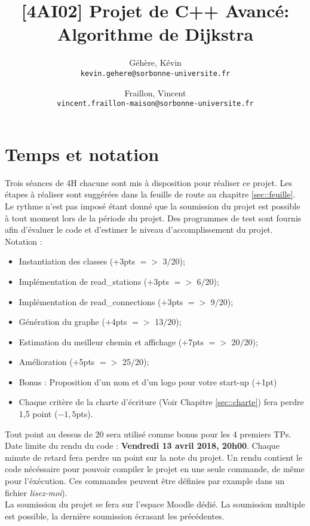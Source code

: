 \documentclass[9pts]{article}
\title{[4AI02] Projet de C++ Avancé: Algorithme de Dijkstra}
\author{
  Géhère, Kévin\\
  \texttt{kevin.gehere@sorbonne-universite.fr}
  \and
  Fraillon, Vincent\\
  \texttt{vincent.fraillon-maison@sorbonne-universite.fr}
}
\begin{document}
\maketitle

\section{Temps et notation}

Trois séances de 4H chacune sont mis à disposition pour réaliser ce projet.
Les étapes à réaliser sont suggérées dans la feuille de route au chapitre \ref{sec::feuille}. Le rythme n'est pas imposé étant donné que la soumission du projet est possible à tout moment lors de la période du projet.
Des programmes de test sont fournis afin d'évaluer le code et d'estimer le niveau d'accomplissement du projet.\\

Notation :
\begin{itemize}
\item Instantiation des classes ($+$3pts $=>$ 3$/$20);
\item Implémentation de read\_stations ($+$3pts $=>$ 6$/$20);
\item Implémentation de read\_connections ($+$3pts $=>$ 9$/$20);
\item Génération du graphe ($+$4pts $=>$ 13$/$20);
\item Estimation du meilleur chemin et affichage ($+$7pts $=>$ 20$/$20);
\item Amélioration ($+$5pts $=>$ 25$/$20);
\item Bonus : Proposition d'un nom et d'un logo pour votre start-up ($+$1pt)
\item Chaque critère de la charte d'écriture (Voir Chapitre \ref{sec::charte}) fera perdre 1,5 point ($-1,5$pts).\\
\end{itemize}

Tout point au dessus de 20 sera utilisé comme bonus pour les 4 premiers TPs.\\

Date limite du rendu du code : \textbf{Vendredi 13 avril 2018, 20h00}. Chaque minute de retard fera perdre un point sur la note du projet. Un rendu contient le code nécéssaire pour pouvoir compiler le projet en une seule commande, de même pour l'éxécution. Ces commandes peuvent être définies par example dans un fichier \emph{lisez-moi}). \\

La soumission du projet se fera sur l'espace Moodle dédié. La soumission multiple est possible, la dernière soumission écrasant les précédentes.
\end{document}
